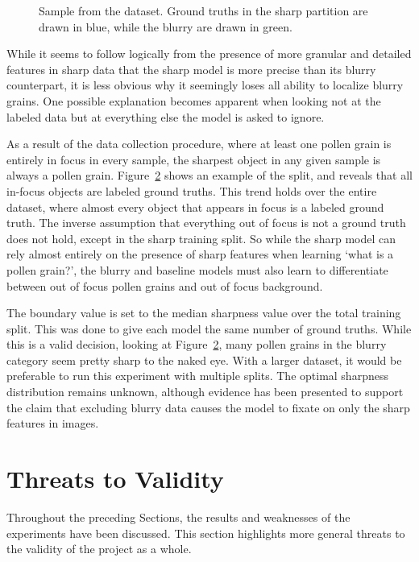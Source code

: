 \begin{figure}[htbp]
\begin{subfigure}[t]{0.35\textwidth}
    \label{fig:results-sharpness-blurry}
  \end{subfigure}
  \caption[Data sample showing split between sharp and blurry data]{%
Sample from the dataset. Ground truths in the sharp partition are drawn in \textcolor{poaceae}{blue}, while the blurry are drawn in \textcolor{alnus}{green}.
  }\label{fig:results-sharp-gt}
\end{figure}

While it seems to follow logically from the presence of more granular and detailed features in sharp data that the sharp model is more precise than its blurry counterpart, it is less obvious why it seemingly loses all ability to localize blurry grains.
One possible explanation becomes apparent when looking not at the labeled data but at everything else the model is asked to ignore.

As a result of the data collection procedure, where at least one pollen grain is entirely in focus in every sample, the sharpest object in any given sample is always a pollen grain.
Figure~\ref{fig:results-sharp-gt} shows an example of the split, and reveals that all in-focus objects are labeled ground truths.
This trend holds over the entire dataset, where almost every object that appears in focus is a labeled ground truth.
The inverse assumption that everything out of focus is not a ground truth does not hold, except in the sharp training split.
So while the sharp model can rely almost entirely on the presence of sharp features when learning `what is a pollen grain?', the blurry and baseline models must also learn to differentiate between out of focus pollen grains and out of focus background.

The boundary value is set to the median sharpness value over the total training split.
This was done to give each model the same number of ground truths.
While this is a valid decision, looking at Figure~\ref{fig:results-sharp-gt}, many pollen grains in the blurry category seem pretty sharp to the naked eye.
With a larger dataset, it would be preferable to run this experiment with multiple splits.
The optimal sharpness distribution remains unknown, although evidence has been presented to support the claim that excluding blurry data causes the model to fixate on only the sharp features in images.

\section{Threats to Validity}\label{sec:results-validity}
Throughout the preceding Sections, the results and weaknesses of the experiments have been discussed.
This section highlights more general threats to the validity of the project as a whole.

